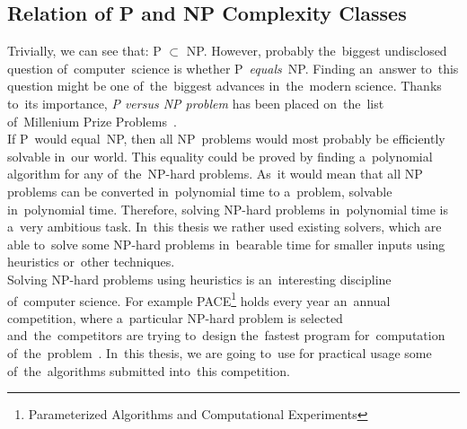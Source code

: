 \subsection{Relation of P and NP Complexity Classes}
Trivially, we can see that:
P $\subset$ NP. However, probably the~biggest undisclosed question of~computer~science is whether P~\textit{equals}~NP. Finding an~answer to~this question might be one of~the~biggest advances in~the~modern science. Thanks to~its importance, \textit{P versus NP problem} has been placed on~the~list of~Millenium Prize Problems~\cite{Jaffe}. \\
If P~would equal~NP, then all NP~problems would most probably be efficiently solvable in~our world. This equality could be proved by finding a~polynomial algorithm for any of~the~NP-hard problems. As~it would mean that all NP problems can be converted in~polynomial time to a~problem, solvable in~polynomial time. Therefore, solving NP-hard problems in~polynomial time is a~very ambitious task. In~this thesis we rather used existing solvers, which are able to~solve some NP-hard problems in~bearable time for smaller inputs using heuristics or~other techniques. \\
Solving NP-hard problems using heuristics is an~interesting discipline of~computer science. For example PACE\footnote{Parameterized Algorithms and Computational Experiments} holds every year an~annual competition, where a~particular NP-hard problem is selected and~the~competitors are trying to~design the~fastest program for~computation of~the~problem~\cite{PACE}. In~this thesis, we are going to~use for practical usage some of~the~algorithms submitted into~this competition.
